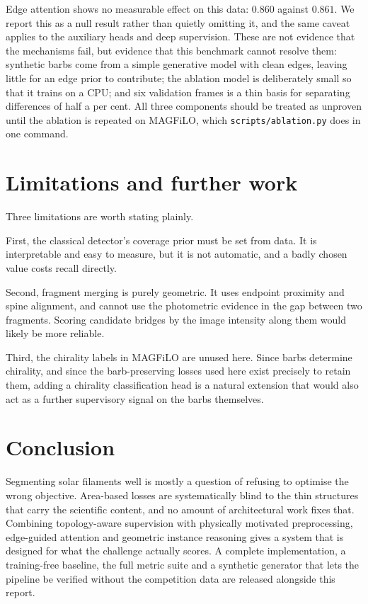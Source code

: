\documentclass[11pt]{article}
\begin{document}
Edge attention shows no measurable effect on this data: $0.860$ against
$0.861$. We report this as a null result rather than quietly omitting it, and
the same caveat applies to the auxiliary heads and deep supervision. These are
not evidence that the mechanisms fail, but evidence that this benchmark cannot
resolve them: synthetic barbs come from a simple generative model with clean
edges, leaving little for an edge prior to contribute; the ablation model is
deliberately small so that it trains on a CPU; and six validation frames is a
thin basis for separating differences of half a per cent. All three components
should be treated as unproven until the ablation is repeated on MAGFiLO, which
\texttt{scripts/ablation.py} does in one command.

\section{Limitations and further work}

Three limitations are worth stating plainly.

First, the classical detector's coverage prior must be set from data. It is
interpretable and easy to measure, but it is not automatic, and a badly chosen
value costs recall directly.

Second, fragment merging is purely geometric. It uses endpoint proximity and
spine alignment, and cannot use the photometric evidence in the gap between two
fragments. Scoring candidate bridges by the image intensity along them would
likely be more reliable.

Third, the chirality labels in MAGFiLO are unused here. Since barbs determine
chirality, and since the barb-preserving losses used here exist precisely to
retain them, adding a chirality classification head is a natural extension that
would also act as a further supervisory signal on the barbs themselves.

\section{Conclusion}

Segmenting solar filaments well is mostly a question of refusing to optimise
the wrong objective. Area-based losses are systematically blind to the thin
structures that carry the scientific content, and no amount of architectural
work fixes that. Combining topology-aware supervision with physically motivated
preprocessing, edge-guided attention and geometric instance reasoning gives a
system that is designed for what the challenge actually scores. A complete
implementation, a training-free baseline, the full metric suite and a synthetic
generator that lets the pipeline be verified without the competition data are
released alongside this report.



\end{document}
